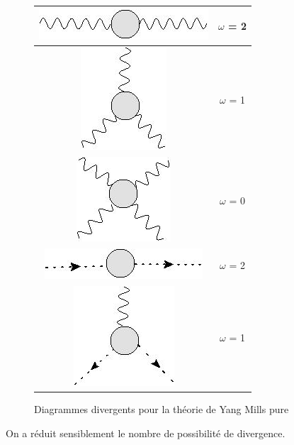 \documentclass[a4paper,11pt]{article}
\theoremstyle{plain}
\theoremstyle{definition}
\theoremstyle{remark}
\numberwithin{equation}{section}
\numberwithin{equation}{subsection}
\numberwithin{figure}{section}
\begin{document}
\begin{figure}[H]
\begin{center}
\begin{tabular}{|c|c|}
   \hline
   \includegraphics[scale = 0.6]{graph_1_div.jpg} & $\omega$ = 2\\
   \hline
   \includegraphics[scale = 0.6]{graph_2_div.jpg} & $\omega$ = 1\\
   \hline
   \includegraphics[scale = 0.6]{graph_3_div.jpg} & $\omega$ = 0\\
   \hline
   \includegraphics[scale = 0.6]{graph_4_div.jpg} & $\omega$ = 2\\
   \hline
   \includegraphics[scale = 0.6]{graph_5_div.jpg} & $\omega$ = 1\\
   \hline
\end{tabular}
\end{center}
\caption{Diagrammes divergents pour la théorie de Yang Mills pure}
\end{figure}

\noindent
On a réduit sensiblement le nombre de possibilité de divergence. 
\end{document}
